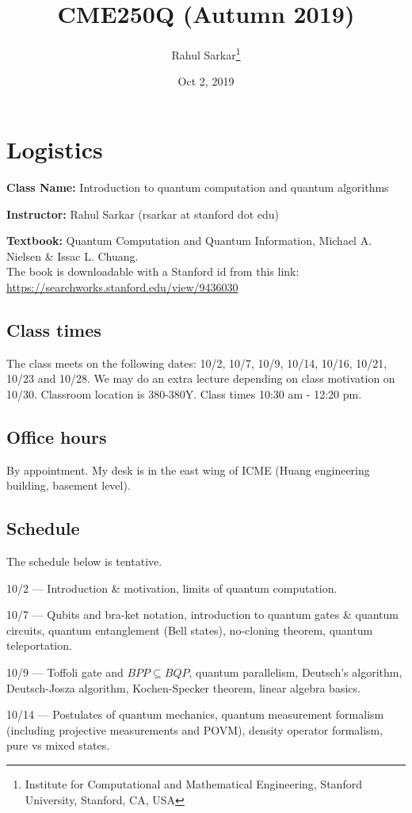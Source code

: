 \documentclass[10pt]{article}
\title{CME250Q (Autumn 2019)}
\author{Rahul Sarkar\footnote{Institute for Computational and Mathematical Engineering, Stanford University, Stanford, CA, USA}}
\date{Oct 2, 2019}
\newcounter{ex}
\theoremstyle{plain}
\theoremstyle{definition}
\begin{document}
\maketitle


\section{Logistics}

\textbf{Class Name:} Introduction to quantum computation and quantum algorithms

\textbf{Instructor:} Rahul Sarkar (rsarkar at stanford dot edu)

\textbf{Textbook:} Quantum Computation and Quantum Information, Michael A. Nielsen \& Issac L. Chuang.\\
The book is downloadable with a Stanford id from this link: \url{https://searchworks.stanford.edu/view/9436030}

\subsection{Class times}
The class meets on the following dates: 10/2, 10/7, 10/9, 10/14, 10/16, 10/21, 10/23 and 10/28. We may do an extra lecture depending on class motivation on 10/30. Classroom location is 380-380Y. Class times 10:30 am - 12:20 pm.

\subsection{Office hours}
By appointment. My desk is in the east wing of ICME (Huang engineering building, basement level).

\subsection{Schedule}
The schedule below is tentative.

10/2 --- Introduction \& motivation, limits of quantum computation. 

10/7 --- Qubits and bra-ket notation, introduction to quantum gates \& quantum circuits, quantum entanglement (Bell states), no-cloning theorem, quantum teleportation.

10/9 --- Toffoli gate and $BPP \subseteq BQP$, quantum parallelism, Deutsch's algorithm, Deutsch-Josza algorithm, Kochen-Specker theorem, linear algebra basics.

10/14 --- Postulates of quantum mechanics, quantum measurement formalism (including projective measurements and POVM), density operator formalism, pure vs mixed states.
\end{document}
